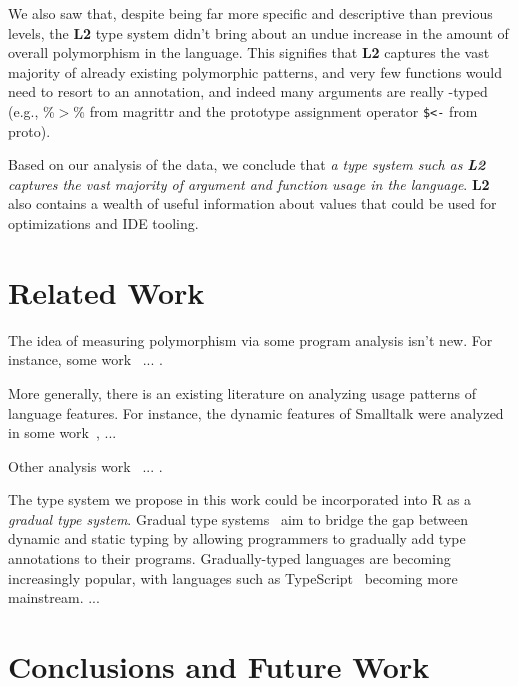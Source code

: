 \documentclass[acmsmall,10pt,review,anonymous]{acmart}\settopmatter{printfolios=true,printccs=false,printacmref=false}
\begin{document}
We also saw that, despite being far more specific and descriptive than previous levels, the {\bf L2} type system didn't bring about an undue increase in the amount of overall polymorphism in the language.
This signifies that {\bf L2} captures the vast majority of already existing polymorphic patterns, and very few functions would need to resort to an \ANY annotation, and indeed many arguments are really \ANY-typed (e.g., \%$>$\% from magrittr and the prototype assignment operator {\tt \$<-} from proto).

Based on our analysis of the data, we conclude that {\it a type system such as} \textbf{\emph{L2}} {\it captures the vast majority of argument and function usage in the language}.
{\bf L2} also contains a wealth of useful information about values that could be used for optimizations and IDE tooling.



%
%
%
%
%

%
%
%
%
\section{Related Work}

The idea of measuring polymorphism via some program analysis isn't new.
For instance, some work~\cite{aakerblom2015measuring} ... .

More generally, there is an existing literature on analyzing usage patterns
of language features.  
For instance, the dynamic features of Smalltalk were analyzed in some work~\cite{callau2011howdevelopers}, ...

Other analysis work~\cite{milojkovic2017duck} ... .

The type system we propose in this work could be incorporated into R as a {\it gradual type system}.
Gradual type systems~\cite{SiekTaha06} aim to bridge the gap between dynamic and static typing by allowing programmers to gradually add type annotations to their programs.
Gradually-typed languages are becoming increasingly popular, with languages such as TypeScript~\cite{typescript13} becoming more mainstream.
...

%
%
%
%
%
\section{Conclusions and Future Work}
\end{document}
